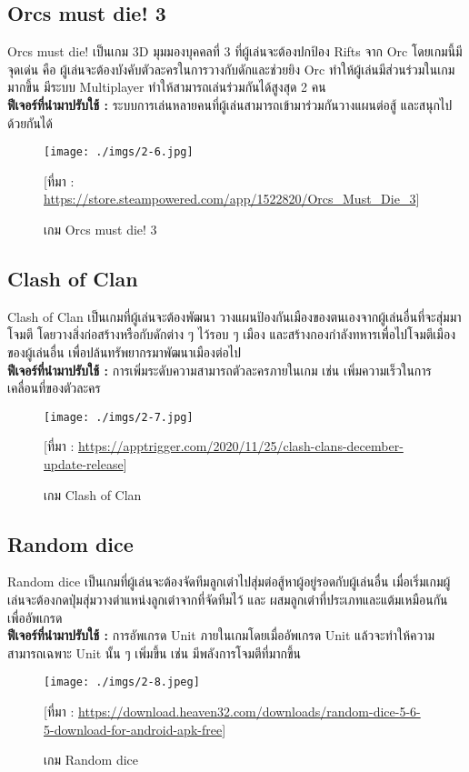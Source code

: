 \documentclass[12pt,oneside,openright,a4paper]{cpe-thai-project}
\begin{document}
\pagebreak
\subsection{Orcs must die! 3}
Orcs must die! เป็นเกม 3D มุมมองบุคคลที่ 3 ที่ผู้เล่นจะต้องปกป้อง Rifts จาก Orc โดยเกมนี้มีจุดเด่น คือ 
ผู้เล่นจะต้องบังคับตัวละครในการวางกับดักและช่วยยิง Orc ทำให้ผู้เล่นมีส่วนร่วมในเกมมากขึ้น มีระบบ Multiplayer 
ทำให้สามารถเล่นร่วมกันได้สูงสุด 2 คน\\
\textbf{ฟีเจอร์ที่นำมาปรับใช้ : } ระบบการเล่นหลายคนที่ผู้เล่นสามารถเข้ามาร่วมกันวางแผนต่อสู้ และสนุกไปด้วยกันได้
\begin{figure}[H]\centering
  \texttt{[image: ./imgs/2-6.jpg]}
  \caption{เกม Orcs must die! 3}\label{fig:2-6}
  \small [ที่มา : \url{https://store.steampowered.com/app/1522820/Orcs_Must_Die_3}]
\end{figure}

\subsection{Clash of Clan}
Clash of Clan เป็นเกมที่ผู้เล่นจะต้องพัฒนา วางแผนป้องกันเมืองของตนเองจากผู้เล่นอื่นที่จะสุ่มมาโจมตี 
โดยวางสิ่งก่อสร้างหรือกับดักต่าง ๆ ไว้รอบ ๆ เมือง และสร้างกองกำลังทหารเพื่อไปโจมตีเมืองของผู้เล่นอื่น
เพื่อปล้นทรัพยากรมาพัฒนาเมืองต่อไป\\
\textbf{ฟีเจอร์ที่นำมาปรับใช้ : } การเพิ่มระดับความสามารถตัวละครภายในเกม เช่น 
เพิ่มความเร็วในการเคลื่อนที่ของตัวละคร
\begin{figure}[H]\centering
  \texttt{[image: ./imgs/2-7.jpg]}
  \caption{เกม Clash of Clan}\label{fig:2-7}
  \small [ที่มา : \url{https://apptrigger.com/2020/11/25/clash-clans-december-update-release}]
\end{figure}

\pagebreak
\subsection{Random dice}
Random dice เป็นเกมที่ผู้เล่นจะต้องจัดทีมลูกเต๋าไปสุ่มต่อสู้หาผู้อยู่รอดกับผู้เล่นอื่น 
เมื่อเริ่มเกมผู้เล่นจะต้องกดปุ่มสุ่มวางตำแหน่งลูกเต๋าจากที่จัดทีมไว้ และ 
ผสมลูกเต๋าที่ประเภทและแต้มเหมือนกันเพื่ออัพเกรด\\
\textbf{ฟีเจอร์ที่นำมาปรับใช้ : } การอัพเกรด Unit ภายในเกมโดยเมื่ออัพเกรด Unit 
แล้วจะทำให้ความสามารถเฉพาะ Unit นั้น ๆ เพิ่มขึ้น เช่น มีพลังการโจมตีที่มากขึ้น
\begin{figure}[H]\centering
  \texttt{[image: ./imgs/2-8.jpeg]}
  \caption{เกม Random dice}\label{fig:2-8}
  \small [ที่มา : \url{https://download.heaven32.com/downloads/random-dice-5-6-5-download-for-android-apk-free}]
\end{figure}
\end{document}
